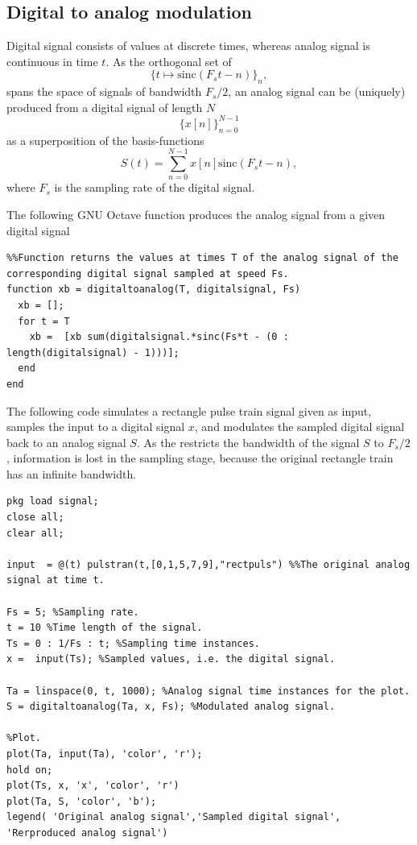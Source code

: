 \documentclass{article}
\begin{document}

\subsection{Digital to analog modulation}
Digital signal consists of values at discrete times, whereas analog signal is continuous in time $t$. As the orthogonal set of 
$$
\{t \mapsto \text{sinc}(F_s t - n)\}_n,
$$
spans the space of signals of bandwidth $F_s/2$, an analog signal can be (uniquely) produced from a digital signal of length $N$ 
$$
\{ x[n]\}_{n=0}^{N-1}
$$
as a superposition of the  basis-functions
$$
S(t) =\sum_{n = 0}^{N-1} x[n]\text{sinc}(F_s t - n),
$$
where $F_s$ is the sampling rate of the digital signal.

The following GNU Octave function produces the analog signal from a given digital signal

\begin{verbatim}
%%Function returns the values at times T of the analog signal of the corresponding digital signal sampled at speed Fs.
function xb = digitaltoanalog(T, digitalsignal, Fs)
  xb = [];
  for t = T
    xb =  [xb sum(digitalsignal.*sinc(Fs*t - (0 : length(digitalsignal) - 1)))];
  end
end
\end{verbatim}

The following code simulates a rectangle pulse train signal given as input, samples the input to a digital signal $x$, and modulates the sampled digital signal back to an analog signal $S$. As the  restricts the bandwidth of the signal $S$ to $F_s/2$, information is lost in the sampling stage, because the original rectangle train has an infinite bandwidth.


\begin{verbatim}
pkg load signal;
close all;
clear all;

input  = @(t) pulstran(t,[0,1,5,7,9],"rectpuls") %%The original analog signal at time t.

Fs = 5; %Sampling rate.
t = 10 %Time length of the signal.
Ts = 0 : 1/Fs : t; %Sampling time instances.
x =  input(Ts); %Sampled values, i.e. the digital signal.

Ta = linspace(0, t, 1000); %Analog signal time instances for the plot.
S = digitaltoanalog(Ta, x, Fs); %Modulated analog signal.

%Plot.
plot(Ta, input(Ta), 'color', 'r');
hold on;
plot(Ts, x, 'x', 'color', 'r')
plot(Ta, S, 'color', 'b');
legend( 'Original analog signal','Sampled digital signal', 'Rerproduced analog signal')

\end{verbatim}
\end{document}

